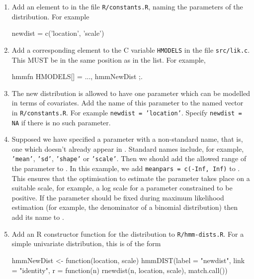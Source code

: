 \begin{enumerate}
\item Add an element to  in the file
  \texttt{R/constants.R}, naming the parameters of the distribution.
  For example
\begin{Scode}
  newdist = c('location', 'scale')
\end{Scode}

\item Add a corresponding element to the C variable \texttt{HMODELS}
  in the file \texttt{src/lik.c}.  This MUST be in the same position
  as in the  list.  For example,
\begin{Scode}
hmmfn HMODELS[] = {
  ...,
  hmmNewDist
};.
\end{Scode}

\item The new distribution is allowed to have one parameter which can
  be modelled in terms of covariates.  Add the name of this parameter
  to the named vector  in
  \texttt{R/constants.R}.  For example \texttt{newdist = 'location'}.
  Specify \texttt{newdist = NA} if there is no such parameter.

\item Supposed we have specified a parameter with a non-standard name,
  that is, one which doesn't already appear in
  . Standard names include, for example,
  \texttt{'mean'}, \texttt{'sd'}, \texttt{'shape'} or
  \texttt{'scale'}.  Then we should add the allowed range of the
  parameter to . In this example, we add
  \texttt{meanpars = c(-Inf, Inf)} to .  This
  ensures that the optimisation to estimate the parameter takes place
  on a suitable scale, for example, a log scale for a parameter
  constrained to be positive.  If the parameter should be fixed during
  maximum likelihood estimation (for example, the denominator of a
  binomial distribution) then add its name to .

\item Add an R constructor function for the distribution to
  \texttt{R/hmm-dists.R}.  For a simple univariate distribution, this is of the
  form
\begin{Scode}
  hmmNewDist <- function(location, scale)
  {
    hmmDIST(label = "newdist",
    link = "identity",
    r = function(n) rnewdist(n, location, scale),
    match.call())
  }
\end{Scode}


\end{enumerate}
